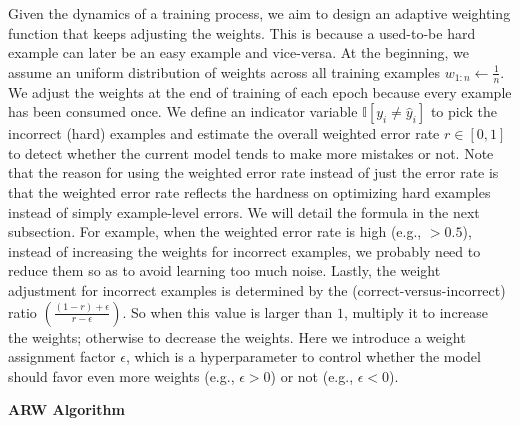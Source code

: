 Given the dynamics of a training process, we aim to design an adaptive weighting function that keeps adjusting the weights.
This is because a used-to-be hard example can later be an easy example and vice-versa.
At the beginning, we assume an uniform distribution of weights across all training examples $w_{1:n} \gets \frac{1}{n} $.
We adjust the weights at the end of training of each epoch because every example has been consumed once.
We define an indicator variable $\mathbb{I}[y_{i} \neq \hat{y}_{i}]$ to pick the incorrect (hard) examples and estimate the overall weighted error rate $r \in [0, 1]$ to detect whether the current model tends to make more mistakes or not. 
Note that the reason for using the weighted error rate instead of just the error rate is that the weighted error rate reflects the hardness on optimizing hard examples instead of simply example-level errors. We will detail the formula in the next subsection.
For example, when the weighted error rate is high (e.g., $>0.5$), instead of increasing the weights for incorrect examples, we probably need to reduce them so as to avoid learning too much noise.
Lastly, the weight adjustment for incorrect examples is determined by the (correct-versus-incorrect) ratio $(\frac{(1-r)+\epsilon}{r-\epsilon})$. So when this value is larger than $1$, multiply it to increase the weights; otherwise to decrease the weights.
Here we introduce a weight assignment factor $\epsilon$, which is a hyperparameter to control whether the model should favor even more weights (e.g., $\epsilon>0$) or not (e.g., $\epsilon<0$).

\textbf{ARW Algorithm}

